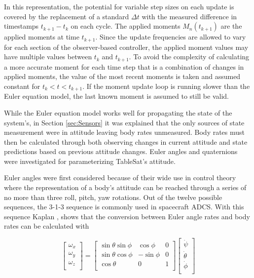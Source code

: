 In this representation, the potential for variable step sizes on each update is covered by the replacement of a standard $\Delta t$ with the measured difference in timestamps $t_{k+1} - t_{k}$ on each cycle.  The applied moments $M_n(t_{k+1})$ are the applied moments at time $t_{k+1}$.  Since the update frequencies are allowed to vary for each section of the observer-based controller, the applied moment values may have multiple values between $t_{k}$ and $t_{k+1}$.  To avoid the complexity of calculating a more accurate moment for each time step that is a combination of changes in applied moments, the value of the most recent moments is taken and assumed constant for $t_{k} < t < t_{k+1}$.  If the moment update loop is running slower than the Euler equation model, the last known moment is assumed to still be valid.

While the Euler equation model works well for propagating the state of the system's, in Section \ref{sec:Sensors} it was explained that the only sources of state measurement were in attitude leaving body rates unmeasured.  Body rates must then be calculated through both observing changes in current attitude and state predictions based on previous attitude changes.  Euler angles and quaternions were investigated for parameterizing TableSat's attitude.

Euler angles were first considered because of their wide use in control theory where the representation of a body's attitude can be reached through a series of no more than three roll, pitch, yaw rotations.   Out of the twelve possible sequences, the 3-1-3 sequence is commonly used in spacecraft ADCS.  With this sequence Kaplan \cite{kaplan}, shows that the conversion between Euler angle rates and body rates can be calculated with

\begin{equation}
  \begin{bmatrix}
    \omega_x \\
    \omega_y \\
    \omega_z \\
  \end{bmatrix}
  =
  \begin{bmatrix}
    \sin \theta \sin \phi & \cos \phi & 0 \\
    \sin \theta \cos \phi & - \sin \phi & 0 \\
    \cos \theta & 0 & 1 \\
  \end{bmatrix}
  \begin{bmatrix}
    \dot{\psi} \\
    \dot{\theta} \\
    \dot{\phi} \\
  \end{bmatrix}
  \label{eqn:EulerToBodyRate}
\end{equation}

